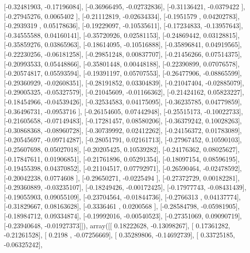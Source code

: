 \documentclass{article}
\begin{document}
       [-0.32481903, -0.17196084],
       [-0.36966495, -0.02732836],
       [-0.31136421, -0.0379422 ],
       [-0.27945276,  0.0065402 ],
       [-0.21112819, -0.02634334],
       [-0.1951579 ,  0.04202783],
       [-0.2939319 ,  0.05178636],
       [-0.19229097, -0.10535611],
       [-0.17234833, -0.13957643],
       [-0.34555588,  0.04160141],
       [-0.35720926,  0.02581153],
       [-0.24869442,  0.03128815],
       [-0.35859276,  0.03865963],
       [-0.18614095, -0.10516888],
       [-0.35896841,  0.04919565],
       [-0.22230256, -0.06181258],
       [-0.29851248,  0.00837707],
       [-0.21456266,  0.07514375],
       [-0.20993533,  0.05448866],
       [-0.35801448,  0.00448188],
       [-0.22390899,  0.07076578],
       [-0.20574817,  0.05593594],
       [-0.19391197,  0.05707553],
       [-0.26477906, -0.08865599],
       [-0.29360929, -0.02608351],
       [-0.28191852,  0.03304839],
       [-0.21047404, -0.02885079],
       [-0.29005325, -0.05327579],
       [-0.21045609, -0.01166362],
       [-0.21424162,  0.05823227],
       [-0.18454966, -0.04539426],
       [-0.32534583,  0.04175095],
       [-0.36235785,  0.04779859],
       [-0.36496731, -0.0953716 ],
       [-0.26154605,  0.07442948],
       [-0.25515173, -0.10022733],
       [-0.21605658, -0.07149483],
       [-0.17281457,  0.08580206],
       [-0.36379242,  0.10028263],
       [-0.30868368, -0.08960728],
       [-0.30739992,  0.02412262],
       [-0.24156372,  0.01783089],
       [-0.20545697, -0.09714287],
       [-0.28051791,  0.02161713],
       [-0.27967452,  0.10590103],
       [-0.25607698,  0.05027018],
       [-0.20205425,  0.10539282],
       [-0.24176362,  0.08025627],
       [-0.17847611,  0.01906851],
       [-0.21761896,  0.05291354],
       [-0.18097154,  0.08596195],
       [-0.19455398,  0.04370852],
       [-0.21104517,  0.07792971],
       [-0.26590464, -0.02478592],
       [-0.20042238,  0.0774608 ],
       [-0.29650271, -0.0225494 ],
       [-0.27372729,  0.00182281],
       [-0.29360889, -0.03235107],
       [-0.18249426, -0.00172425],
       [-0.17977743, -0.08431439],
       [-0.19055903,  0.09055109],
       [-0.23704564, -0.01844736],
       [-0.2766313 ,  0.04137774],
       [-0.31829667,  0.08163628],
       [-0.3336461 ,  0.0200568 ],
       [-0.28584798, -0.05981905],
       [-0.18984712,  0.09334874],
       [-0.19992016, -0.00540523],
       [-0.27351069,  0.09090719],
       [-0.23940648, -0.01927373]]), array([[ 0.18222628, -0.13098267],
       [ 0.17361282, -0.21261528],
       [ 0.2198    , -0.07256669],
       [ 0.35289806, -0.14692739],
       [ 0.33725185, -0.06325242],
\end{document}
